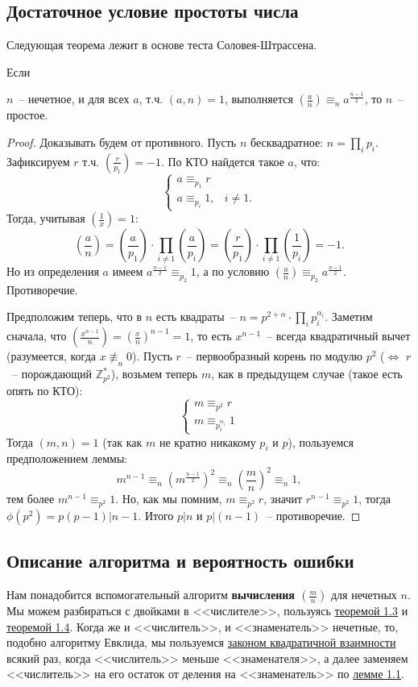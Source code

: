 \subsection{Достаточное условие простоты числа}
Следующая теорема лежит в основе теста Соловея-Штрассена.
\begin{theorem}\hypertarget{solovaytest}{Если} $n$~-- нечетное, и для всех $a$, т.ч. $(a,n)=1$, выполняется $\left(\frac{a}{n}\right)\equiv_n a^\frac{n-1}{2}$, то $n$~-- простое.
\end{theorem}
\begin{proof}
Доказывать будем от противного.
Пусть $n$ бесквадратное: $n=\prod_i p_i$. Зафиксируем $r$ т.ч. $\left(\frac{r}{p_1}\right)=-1$. По КТО найдется такое $a$, что:
$$\begin{cases}
a\equiv_{p_1} r\\
a\equiv_{p_i} 1, & i\ne1.
\end{cases}$$
Тогда, учитывая $\left(\frac{1}{x}\right) = 1$: $$\left(\frac{a}{n}\right)=\left(\frac{a}{p_1}\right)\cdot\prod_{i\ne1}\left(\frac{a}{p_i}\right)=\left(\frac{r}{p_1}\right)\cdot\prod_{i\ne1}\left(\frac{1}{p_i}\right)=-1.$$ Но из определения $a$ имеем $a^\frac{n-1}{2}\equiv_{p_2}1$, а по условию $\left(\frac{a}{n}\right)\equiv_{p_2} a^\frac{n-1}{2}$. Противоречие.

Предположим теперь, что в $n$ есть квадраты~-- $n=p^{2+\alpha}\cdot\prod_{i} p_i^{\alpha_i}$.
Заметим сначала, что $\left(\frac{x^{n-1}}{n}\right)=\left(\frac{x}{n}\right)^{n-1}=1$, то есть $x^{n-1}$~-- всегда квадратичный вычет (разумеется, когда $x\not\equiv_n 0$).
Пусть $r$~-- первообразный корень по модулю $p^2$ ($\iff$ $r$~-- порождающий $\mathbb Z_{p^2}^*$), возьмем теперь $m$, как в предыдущем случае (такое есть опять по КТО):
$$\begin{cases}
m\equiv_{p^2} r \\
m\equiv_{p_i^{\alpha_i}} 1
\end{cases}$$
Тогда $(m,n)=1$ (так как $m$ не кратно никакому $p_i$ и $p$), пользуемся предположением леммы:
$$m^{n-1}\equiv_n \left(m^\frac{n-1}{2}\right)^2\equiv_n \left(\frac{m}{n}\right)^2\equiv_n1,$$ тем более $m^{n-1}\equiv_{p^2}1$. Но, как мы помним, $m\equiv_{p^2}r$, значит $r^{n-1}\equiv_{p^2}1$, тогда $\phi(p^2)=p(p-1)|n-1$. Итого $p|n$ и $p|(n-1)$~-- противоречие.
\end{proof}

\subsection{Описание алгоритма и вероятность ошибки}
Нам понадобится вспомогательный алгоритм \textbf{вычисления $\left(\frac{m}{n}\right)$} для нечетных $n$. Мы можем разбираться с двойками в <<числителе>>, пользуясь \hyperlink{multiplicative}{теоремой 1.3} и \hyperlink{twojacobi}{теоремой 1.4}. Когда же и <<числитель>>, и <<знаменатель>> нечетные, то, подобно алгоритму Евклида, мы пользуемся \hyperlink{qreciproc}{законом квадратичной взаимности} всякий раз, когда <<числитель>> меньше <<знаменателя>>, а далее заменяем <<числитель>>  на его остаток от деления на <<знаменатель>> по \hyperlink{aequivb}{лемме 1.1}.

